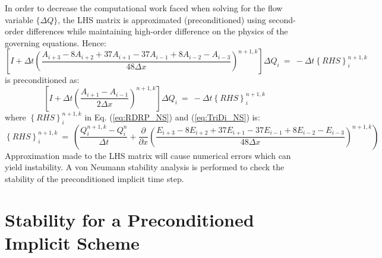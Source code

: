 \documentclass[conf]{new-aiaa}
\begin{document}
In order to decrease the computational work faced when solving for the flow variable $\{\Delta{Q}\}$, the LHS matrix is approximated (preconditioned) using second-order differences while maintaining high-order difference on the physics of the governing equations. Hence:
\begin{equation}
	\label{eq:RDRP_NS}
  		\left[I+\Delta{t}\left(\frac{A_{i+3}-8A_{i+2}+37A_{i+1}-37A_{i-1}+8A_{i-2}-A_{i-3}}{48\Delta{x}}\right)^{n+1,k}\right]\Delta{Q}_i~=~-\Delta{t}\left\{RHS\right\}_i^{n+1, k}
\end{equation}
is preconditioned as:
\begin{equation}
	\label{eq:TriDi_NS}
  		\left[I+\Delta{t}\left(\frac{A_{i+1}-A_{i-1}}{2\Delta{x}}\right)^{n+1,k}\right]\Delta{Q}_i~=~-\Delta{t}\left\{RHS\right\}_i^{n+1, k}
\end{equation}
where $\left\{RHS\right\}_i^{n+1, k}$ in Eq. (\ref{eq:RDRP_NS}) and (\ref{eq:TriDi_NS}) is: 
\begin{equation*}
	\left\{RHS\right\}_i^{n+1, k}~=~\left(\frac{Q_i^{n+1, k}-Q_i^n}{\Delta{t}}+\frac{\partial}{\partial{x}}\left(\frac{E_{i+3}-8E_{i+2}+37E_{i+1}-37E_{i-1}+8E_{i-2}-E_{i-3}}{48\Delta{x}}\right)^{n+1,k}\right)
\end{equation*}
Approximation made to the LHS matrix will cause numerical errors which can yield instability. A von Neumann stability analysis is performed to check the stability of the preconditioned implicit time step. 

\section{Stability for a Preconditioned Implicit Scheme}
\end{document}

